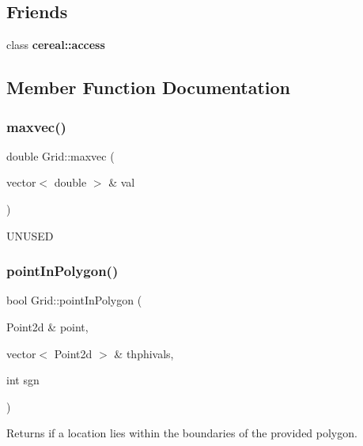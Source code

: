 \subsection*{Friends}
\begin{DoxyCompactItemize}
\item 
\mbox{\label{class_grid_ab2f44cbb59a08132f4c843e5225bba0e}} 
class {\bfseries cereal\+::access}
\end{DoxyCompactItemize}


\subsection{Member Function Documentation}
\mbox{\label{class_grid_a272276e3a52a84dea9c72c106f0577e0}} 
\subsubsection{\texorpdfstring{maxvec()}{maxvec()}}
{\footnotesize\ttfamily double Grid\+::maxvec (\begin{DoxyParamCaption}\item[{vector$<$ double $>$ \&}]{val }\end{DoxyParamCaption})\hspace{0.3cm}{\ttfamily [inline]}}

U\+N\+U\+S\+ED \mbox{\label{class_grid_a351334d1546393245bf17660e43c3db0}} 
\subsubsection{\texorpdfstring{point\+In\+Polygon()}{pointInPolygon()}}
{\footnotesize\ttfamily bool Grid\+::point\+In\+Polygon (\begin{DoxyParamCaption}\item[{Point2d \&}]{point,  }\item[{vector$<$ Point2d $>$ \&}]{thphivals,  }\item[{int}]{sgn }\end{DoxyParamCaption})\hspace{0.3cm}{\ttfamily [inline]}}

Returns if a location lies within the boundaries of the provided polygon. \mbox{\label{class_grid_ad5f7823505cc5ee751cdcd6b7dc1e2f4}} 
